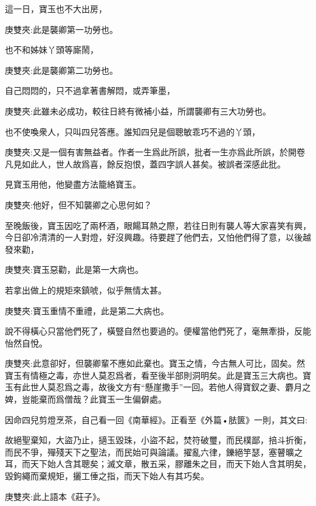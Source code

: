 \begin{parag}
    這一日，寶玉也不大出房，\begin{note}庚雙夾:此是襲卿第一功勞也。\end{note}也不和姊妹丫頭等廝鬧，\begin{note}庚雙夾:此是襲卿第二功勞也。\end{note}自己悶悶的，只不過拿著書解悶，或弄筆墨，\begin{note}庚雙夾:此雖未必成功，較往日終有微補小益，所謂襲卿有三大功勞也。\end{note}也不使喚衆人，只叫四兒答應。誰知四兒是個聰敏乖巧不過的丫頭，\begin{note}庚雙夾:又是一個有害無益者。作者一生爲此所誤，批者一生亦爲此所誤，於開卷凡見如此人，世人故爲喜，餘反抱恨，蓋四字誤人甚矣。被誤者深感此批。\end{note}見寶玉用他，他變盡方法籠絡寶玉。\begin{note}庚雙夾:他好，但不知襲卿之心思何如？\end{note}至晚飯後，寶玉因吃了兩杯酒，眼餳耳熱之際，若往日則有襲人等大家喜笑有興，今日卻冷清清的一人對燈，好沒興趣。待要趕了他們去，又怕他們得了意，以後越發來勸，\begin{note}庚雙夾:寶玉惡勸，此是第一大病也。\end{note}若拿出做上的規矩來鎮唬，似乎無情太甚。\begin{note}庚雙夾:寶玉重情不重禮，此是第二大病也。\end{note}說不得橫心只當他們死了，橫豎自然也要過的。便權當他們死了，毫無牽掛，反能怡然自悅。\begin{note}庚雙夾:此意卻好，但襲卿輩不應如此棄也。寶玉之情，今古無人可比，固矣。然寶玉有情極之毒，亦世人莫忍爲者，看至後半部則洞明矣。此是寶玉三大病也。寶玉有此世人莫忍爲之毒，故後文方有“懸崖撒手”一回。若他人得寶釵之妻、麝月之婢，豈能棄而爲僧哉？此寶玉一生偏僻處。\end{note}因命四兒剪燈烹茶，自己看一回《南華經》。正看至《外篇•胠篋》一則，其文曰:
\end{parag}


\begin{qute2sp}

    故絕聖棄知，大盜乃止，擿玉毀珠，小盜不起，焚符破璽，而民樸鄙，掊斗折衡，而民不爭，殫殘天下之聖法，而民始可與論議。擢亂六律，鑠絕竽瑟，塞瞽曠之耳，而天下始人含其聰矣；滅文章，散五采，膠離朱之目，而天下始人含其明矣，毀鉤繩而棄規矩，攦工倕之指，而天下始人有其巧矣。\begin{note}庚雙夾:此上語本《莊子》。\end{note}
\end{qute2sp}


